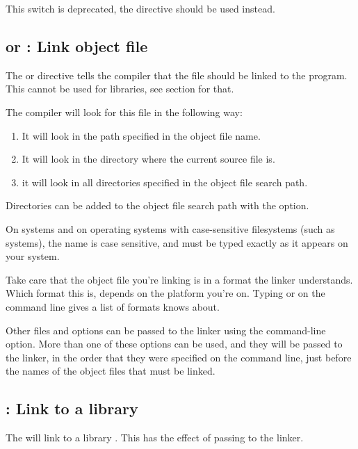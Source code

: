 This switch is deprecated, the  directive should
be used instead.

\subsection{ or  : Link object file}

The  or  directive
tells the compiler that the file  should be linked to
the program. This cannot be used for libraries, see section
 for that.

The compiler will look for this file in the following way:

\begin{enumerate}
\item It will look in the path specified in the object file name.
\item It will look in the directory where the current source file is.
\item it will look in all directories specified in the object file search path.
\end{enumerate}
Directories can be added to the object file search path with the 
option.

On \linux systems and on operating systems with case-sensitive filesystems
(such as \unix systems), the name is case sensitive, and must be typed
exactly as it appears on your system.

\begin{remark}Take care that the object file you're linking is in a
format the linker understands. Which format this is, depends on the platform
you're on. Typing  or  on the command line gives a list of formats
 knows about.
\end{remark}

Other files and options can be passed to the linker using the 
command-line option. More than one of these options can be used, and
they will be passed to the linker, in the order that they were specified on
the command line, just before the names of the object files that must be
linked.

\subsection{ : Link to a library}
\label{se:linklib}

The  will link to a library .
This has the effect of passing  to the linker.

